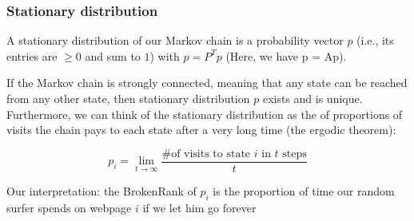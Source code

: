 \documentclass[mathserif]{beamer}
\def\red{\color[rgb]{0.8,0,0}}
\begin{document}

\begin{frame}
\frametitle{Stationary distribution}
\smallskip
\smallskip
A {\red stationary distribution} of our Markov 
chain is a probability vector $p$ (i.e., its 
entries are $\geq 0$ and sum to $1$) with
$p = P^Tp$ (Here, we have p = Ap). 


\bigskip
If the Markov chain is {\red strongly connected},
meaning that any state can be reached from any
other state, then stationary distribution $p$ 
exists and is {\red unique}.
Furthermore, we can think of the stationary 
distribution as the of proportions of visits the chain 
pays to each state after a very long time 
(the ergodic theorem):

$$p_i = \lim_{t \rightarrow \infty} 
\frac{\text{\# of visits to state $i$ in $t$ steps}}{t}$$

\bigskip
{\red Our interpretation}: the BrokenRank of $p_i$ is
the proportion of time our random surfer spends on 
webpage $i$ if we let him go forever
\end{frame}
\end{document}
